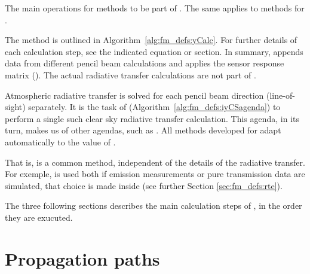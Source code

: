 \begin{algorithm}[t]
 \begin{algorithmic}
 \end{algorithmic}
 \caption{The main operations for methods to be part of
   . The same applies to methods for
   .}
 \label{alg:fm_defs:iyCSagenda}
\end{algorithm}
The  method is outlined in Algorithm~\ref{alg:fm_defs:yCalc}.
For further details of each calculation step, see the indicated equation or
section. In summary,  appends data from different pencil beam
calculations and applies the sensor response matrix (). The actual
radiative transfer calculations are not part of .

Atmospheric radiative transfer is solved for each pencil beam direction
(line-of-sight) separately. It is the task of 
(Algorithm~\ref{alg:fm_defs:iyCSagenda}) to perform a single such clear sky
radiative transfer calculation. This agenda, in its turn, makes us of other
agendas, such as . All methods developed for
 adapt automatically to the value of
.

That is,  is a common method, independent of the details of
the radiative transfer. For exemple,  is used both if emission
measurements or pure transmission data are simulated, that choice is made
inside  (see further Section
\ref{sec:fm_defs:rte}). 

The three following sections describes the main calculation steps of 
, in the order they are exucuted.


\section{Propagation paths}
\label{sec:fm_defs:ppaths}

